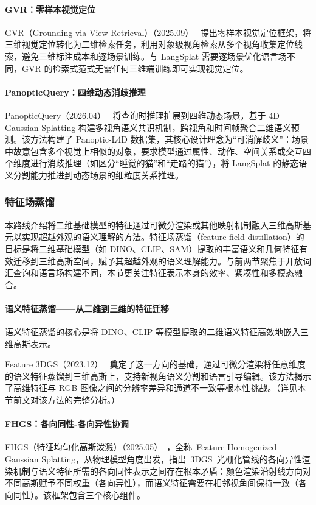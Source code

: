 \paragraph{GVR：零样本视觉定位} GVR（Grounding via View Retrieval）（2025.09）~\cite{2509_15871} 提出零样本视觉定位框架，将三维视觉定位转化为二维检索任务，利用对象级视角检索从多个视角收集定位线索，避免三维标注成本和逐场景训练。与 LangSplat 需要逐场景优化语言场不同，GVR 的检索式范式无需任何三维端训练即可实现视觉定位。

\paragraph{PanopticQuery：四维动态消歧推理} PanopticQuery（2026.04）~\cite{2604_05638} 将查询时推理扩展到四维动态场景，基于 4D Gaussian Splatting 构建多视角语义共识机制，跨视角和时间帧聚合二维语义预测。该方法构建了 Panoptic-L4D 数据集，其核心设计理念为``可消解歧义''：场景中故意包含多个视觉上相似的对象，要求模型通过属性、动作、空间关系或交互四个维度进行消歧推理（如区分``睡觉的猫''和``走路的猫''），将 LangSplat 的静态语义分割能力推进到动态场景的细粒度关系推理。

\subsubsection{特征场蒸馏}

本路线介绍将二维基础模型的特征通过可微分渲染或其他映射机制融入三维高斯基元以实现超越外观的语义理解的方法。特征场蒸馏（feature field distillation）的目标是将二维基础模型（如 DINO、CLIP、SAM）提取的丰富语义和几何特征有效迁移到三维高斯空间，赋予其超越外观的语义理解能力。与前两节聚焦于开放词汇查询和语言场构建不同，本节更关注特征表示本身的效率、紧凑性和多模态融合。

\paragraph{语义特征蒸馏——从二维到三维的特征迁移}

语义特征蒸馏的核心是将 DINO、CLIP 等模型提取的二维语义特征高效地嵌入三维高斯表示。

Feature 3DGS（2023.12）~\cite{2312_03203} 奠定了这一方向的基础，通过可微分渲染将任意维度的语义特征蒸馏到三维高斯上，支持新视角语义分割和语言引导编辑。该方法揭示了高维特征与 RGB 图像之间的分辨率差异和通道不一致等根本性挑战。（详见本节前文对该方法的完整分析。）

\paragraph{FHGS：各向同性-各向异性协调} FHGS（特征均匀化高斯泼溅）（2025.05）~\cite{2505_19154}，全称~Feature-Homogenized Gaussian Splatting，从物理模型角度出发，指出~3DGS~光栅化管线的各向异性渲染机制与语义特征所需的各向同性表示之间存在根本矛盾：颜色渲染沿射线方向对不同高斯赋予不同权重（各向异性），而语义特征需要在相邻视角间保持一致（各向同性）。该框架包含三个核心组件。

